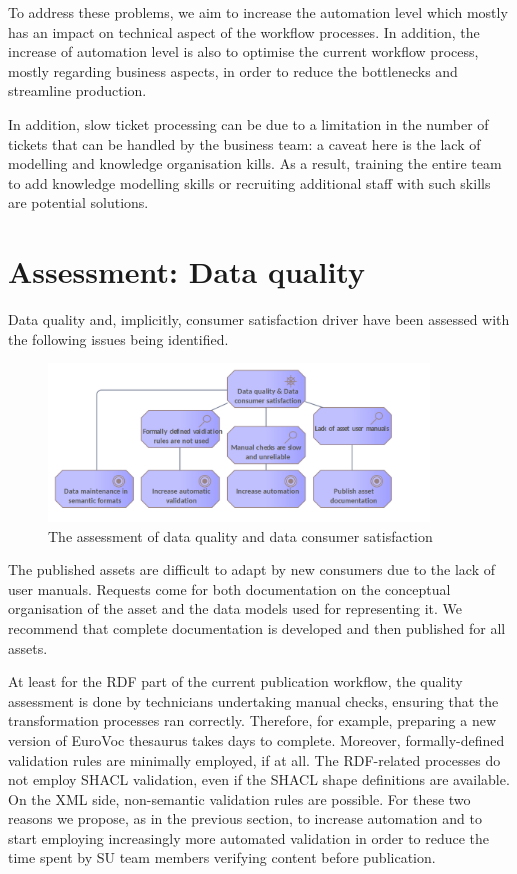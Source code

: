 	To address these problems, we aim to increase the automation level which mostly has an impact on technical aspect of the workflow processes. In addition, the increase of automation level is also to optimise the current workflow process, mostly regarding business aspects, in order to reduce the bottlenecks and streamline production.  
	
	In addition, slow ticket processing can be due to a limitation in the number of tickets that can be handled by the business team: a caveat here is the lack of modelling and knowledge organisation kills. As a result,  training the entire team to add knowledge modelling skills or recruiting additional staff with such skills are potential solutions. 
	

	\section{Assessment: Data quality}

    Data quality and, implicitly, consumer satisfaction driver have been assessed with the following issues being identified.
    
	\begin{figure}[!h]
		\centering
		\includegraphics[width=0.9\textwidth]{images/motivation/Data quality.png}
		\caption{The assessment of data quality and data consumer satisfaction}
		\label{fig:data-quality}
	\end{figure}

    The published assets are difficult to adapt by new consumers due to the lack of user manuals. Requests come for both documentation on the conceptual organisation of the asset and the data models used for representing it. We recommend that complete documentation is developed and then published for all assets.
    
    At least for the RDF part of the current publication workflow, the quality assessment is done by technicians undertaking manual checks, ensuring that the transformation processes ran correctly. Therefore, for example, preparing a new version of EuroVoc thesaurus takes days to complete. Moreover, formally-defined validation rules are minimally employed, if at all. The RDF-related processes do not employ SHACL validation, even if the SHACL shape definitions are available. On the XML side, non-semantic validation rules are possible. For these two reasons we propose, as in the previous section, to increase automation and to start employing increasingly more automated validation in order to reduce the time spent by SU team members verifying content before publication. 
    
